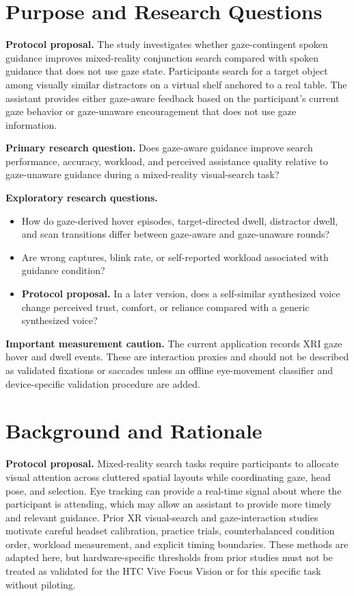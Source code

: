 \documentclass[11pt,letterpaper]{article}
\newcommand{\status}[1]{\textbf{#1.}}
\begin{document}
\section{Purpose and Research Questions}

\status{Protocol proposal} The study investigates whether gaze-contingent spoken guidance improves mixed-reality conjunction search compared with spoken guidance that does not use gaze state. Participants search for a target object among visually similar distractors on a virtual shelf anchored to a real table. The assistant provides either gaze-aware feedback based on the participant's current gaze behavior or gaze-unaware encouragement that does not use gaze information.

\textbf{Primary research question.} Does gaze-aware guidance improve search performance, accuracy, workload, and perceived assistance quality relative to gaze-unaware guidance during a mixed-reality visual-search task?

\textbf{Exploratory research questions.}
\begin{itemize}
  \item How do gaze-derived hover episodes, target-directed dwell, distractor dwell, and scan transitions differ between gaze-aware and gaze-unaware rounds?
  \item Are wrong captures, blink rate, or self-reported workload associated with guidance condition?
  \item \status{Protocol proposal} In a later version, does a self-similar synthesized voice change perceived trust, comfort, or reliance compared with a generic synthesized voice?
\end{itemize}

\textbf{Important measurement caution.} The current application records XRI gaze hover and dwell events. These are interaction proxies and should not be described as validated fixations or saccades unless an offline eye-movement classifier and device-specific validation procedure are added.

\section{Background and Rationale}

\status{Protocol proposal} Mixed-reality search tasks require participants to allocate visual attention across cluttered spatial layouts while coordinating gaze, head pose, and selection. Eye tracking can provide a real-time signal about where the participant is attending, which may allow an assistant to provide more timely and relevant guidance. Prior XR visual-search and gaze-interaction studies motivate careful headset calibration, practice trials, counterbalanced condition order, workload measurement, and explicit timing boundaries. These methods are adapted here, but hardware-specific thresholds from prior studies must not be treated as validated for the HTC Vive Focus Vision or for this specific task without piloting.
\end{document}
